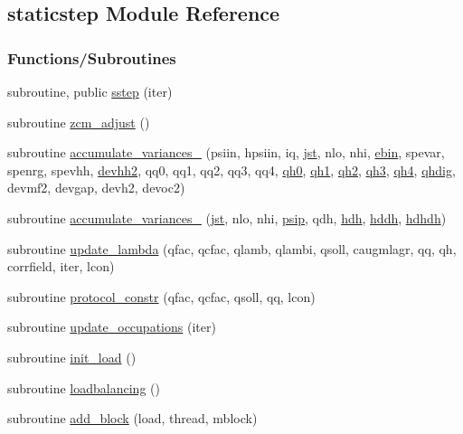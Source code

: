 \hypertarget{namespacestaticstep}{}\subsection{staticstep Module Reference}
\label{namespacestaticstep}
\subsubsection*{Functions/\+Subroutines}
\begin{DoxyCompactItemize}
\item 
subroutine, public \hyperlink{namespacestaticstep_aafbae5fcc8b88a8a4d88e7ad1e05a899}{sstep} (iter)
\item 
subroutine \hyperlink{namespacestaticstep_ae2989b0c1c4604ed91faa577c40e3a4a}{zcm\+\_\+adjust} ()
\item 
subroutine \hyperlink{namespacestaticstep_aaf61333300ac38c50d5890a9aff28456}{accumulate\+\_\+variances\+\_} (psiin, hpsiin, iq, \hyperlink{namespacestaticstep_a9aa7dee4efe93fca07853f6989b2f045}{jst}, nlo, nhi, \hyperlink{namespacestaticstep_aee43c6b0cea94f1487aed360ca42fcb4}{ebin}, spevar, spenrg, spevhh, \hyperlink{namespacestaticstep_a6be970f33ea95ee3b6c1553e88748961}{devhh2}, qq0, qq1, qq2, qq3, qq4, \hyperlink{namespacestaticstep_a41743f17b5730664e6c770a4d4ea2110}{qh0}, \hyperlink{namespacestaticstep_a91a6199d4eec95cff08b94738690894a}{qh1}, \hyperlink{namespacestaticstep_a897519f2def07749c367f0380bdc452a}{qh2}, \hyperlink{namespacestaticstep_ade5f5f5eb8e4fe1c8c95cbbfe3eab7fb}{qh3}, \hyperlink{namespacestaticstep_a565f7e97adec7cf001d80bcbeb5294b9}{qh4}, \hyperlink{namespacestaticstep_a03eb2b19fb183c4ec6075241077232ca}{qhdig}, devmf2, devgap, devh2, devoc2)
\item 
subroutine \hyperlink{namespacestaticstep_af672da037f64ebf0a4435b5af395f0e9}{accumulate\+\_\+variances\+\_} (\hyperlink{namespacestaticstep_a9aa7dee4efe93fca07853f6989b2f045}{jst}, nlo, nhi, \hyperlink{namespacestaticstep_af4d990f6823f777da64820a0c2b57616}{psip}, qdh, \hyperlink{namespacestaticstep_a356065bb46b188687661cc58f93d058d}{hdh}, \hyperlink{namespacestaticstep_a31efc0c841017e316500c37afcf7dc8a}{hddh}, \hyperlink{namespacestaticstep_aa7f31f9f91a7710115dc3b41e204a17a}{hdhdh})
\item 
subroutine \hyperlink{namespacestaticstep_a1117ff016ebf0853ab6d064306a22251}{update\+\_\+lambda} (qfac, qcfac, qlamb, qlambi, qsoll, caugmlagr, qq, qh, corrfield, iter, lcon)
\item 
subroutine \hyperlink{namespacestaticstep_ae9ea84cc70a5ccb243884f8a667a43c7}{protocol\+\_\+constr} (qfac, qcfac, qsoll, qq, lcon)
\item 
subroutine \hyperlink{namespacestaticstep_a09f0e694780bb6b797fcf5b3770af031}{update\+\_\+occupations} (iter)
\item 
subroutine \hyperlink{namespacestaticstep_a748ee1b9e0178c735a49f12b9848b05c}{init\+\_\+load} ()
\item 
subroutine \hyperlink{namespacestaticstep_a92e0512441559a3aa9fc1729fe02034c}{loadbalancing} ()
\item 
subroutine \hyperlink{namespacestaticstep_a5f7ce9af7ea6a48e66b723c194c839e0}{add\+\_\+block} (load, thread, mblock)
\end{DoxyCompactItemize}
